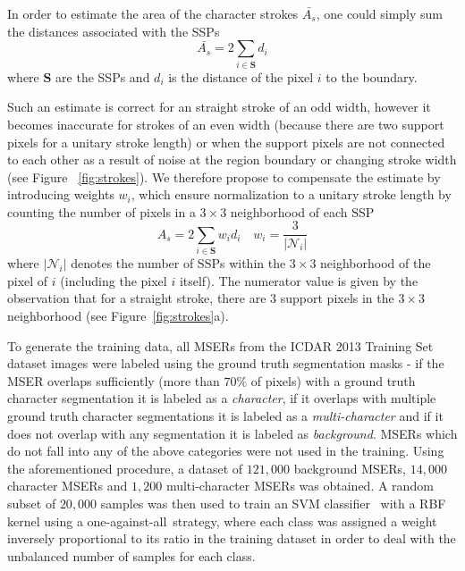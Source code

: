 \documentclass[conference]{IEEEtran}
\begin{document}
In order to estimate the area of the character strokes $\bar{A_s}$, one could simply sum the distances associated with the SSPs
\begin{equation}
\bar{A_s} = 2\sum_{ i\in \mathbf{S}} d_i
\end{equation}
where $\mathbf{S}$ are the SSPs and $d_i$ is the distance of the pixel $i$ to the boundary.

Such an estimate is correct for an straight stroke of an odd width, however it becomes inaccurate for strokes of an even width (because there are two support pixels for a unitary stroke length) or when the support pixels are not connected to each other as a result of noise at the region boundary or changing stroke width (see Figure ~\ref{fig:strokes}). We therefore propose to compensate the estimate by introducing weights $w_i$, which ensure normalization to a unitary stroke length by counting the number of pixels in a $3\times3$ neighborhood of each SSP
\begin{equation}
A_s = 2\sum_{ i\in \mathbf{S}} w_id_i \quad w_i=\frac{3}{|\mathcal{N}_i|}
\end{equation}
where $|\mathcal{N}_i|$ denotes the number of SSPs within the $3\times3$ neighborhood of the pixel of $i$ (including the pixel $i$ itself). The numerator value is given by the observation that for a straight stroke, there are $3$ support pixels in the $3\times3$ neighborhood (see Figure~\ref{fig:strokes}a).

To generate the training data, all MSERs from the ICDAR 2013 Training Set~\cite{ICDAR2013} dataset images were labeled using the ground truth segmentation masks - if the MSER overlaps sufficiently (more than $70\%$ of pixels) with a ground truth character segmentation it is labeled as a \emph{character}, if it overlaps with multiple ground truth character segmentations it is labeled as a \emph{multi-character} and if it does not overlap with any segmentation it is labeled as \emph{background}. MSERs which do not fall into any of the above categories were not used in the training. Using the aforementioned procedure, a dataset of $121{,}000$ background MSERs, $14{,}000$ character MSERs and $1{,}200$ multi-character MSERs was obtained. A random subset of $20{,}000$ samples was then used to train an SVM classifier~\cite{SVM} with a RBF~\cite{RBF} kernel using a \mbox{one-against-all strategy}, where each class was assigned a weight inversely proportional to its ratio in the training dataset in order to deal with the unbalanced number of samples for each class.
\end{document}
